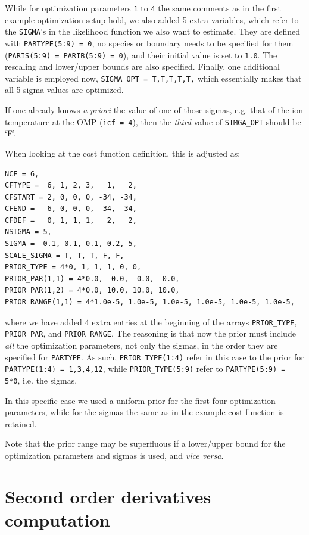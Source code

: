 While for optimization parameters {\tt 1} to {\tt 4} the same comments as in the first example optimization setup hold, we also added 5 extra variables, which refer to the {\tt SIGMA}'s in the likelihood function we also want to estimate. They are defined with {\tt PARTYPE(5:9) = 0}, no species or boundary needs to be specified for them ({\tt PARIS(5:9) = PARIB(5:9) = 0}), and their initial value is set to {\tt 1.0}. The rescaling and lower/upper bounds are also specified. Finally, one additional variable is employed now, {\tt SIGMA\_OPT = T,T,T,T,T,} which essentially makes that all 5 sigma values are optimized.

If one already knows {\it a priori} the value of one of those sigmas, e.g. that of the ion temperature at the OMP ({\tt icf = 4}), then the {\em third} value of {\tt SIMGA\_OPT} should be `F'.

When looking at the cost function definition, this is adjusted as:
\begin{verbatim}
NCF = 6,
CFTYPE =  6, 1, 2, 3,   1,   2,
CFSTART = 2, 0, 0, 0, -34, -34,
CFEND =   6, 0, 0, 0, -34, -34,
CFDEF =   0, 1, 1, 1,   2,   2,
NSIGMA = 5,
SIGMA =  0.1, 0.1, 0.1, 0.2, 5,
SCALE_SIGMA = T, T, T, F, F,
PRIOR_TYPE = 4*0, 1, 1, 1, 0, 0,
PRIOR_PAR(1,1) = 4*0.0,  0.0,  0.0,  0.0,
PRIOR_PAR(1,2) = 4*0.0, 10.0, 10.0, 10.0,
PRIOR_RANGE(1,1) = 4*1.0e-5, 1.0e-5, 1.0e-5, 1.0e-5, 1.0e-5, 1.0e-5,
\end{verbatim}

where we have added 4 extra entries at the beginning of the arrays {\tt PRIOR\_TYPE}, {\tt PRIOR\_PAR}, and {\tt PRIOR\_RANGE}. The reasoning is that now the prior must include {\em all} the optimization parameters, not only the sigmas, in the order they are specified for {\tt PARTYPE}. As such, {\tt PRIOR\_TYPE(1:4)} refer in this case to the prior for {\tt PARTYPE(1:4) = 1,3,4,12}, while {\tt PRIOR\_TYPE(5:9)} refer to {\tt PARTYPE(5:9) = 5*0}, i.e. the sigmas.

In this specific case we used a uniform prior for the first four optimization parameters, while for the sigmas the same as in the example cost function is retained.

Note that the prior range may be superfluous if a lower/upper bound for the optimization parameters and sigmas is used, and {\it vice versa}.

\section{Second order derivatives computation}\label{sec:hessian}

